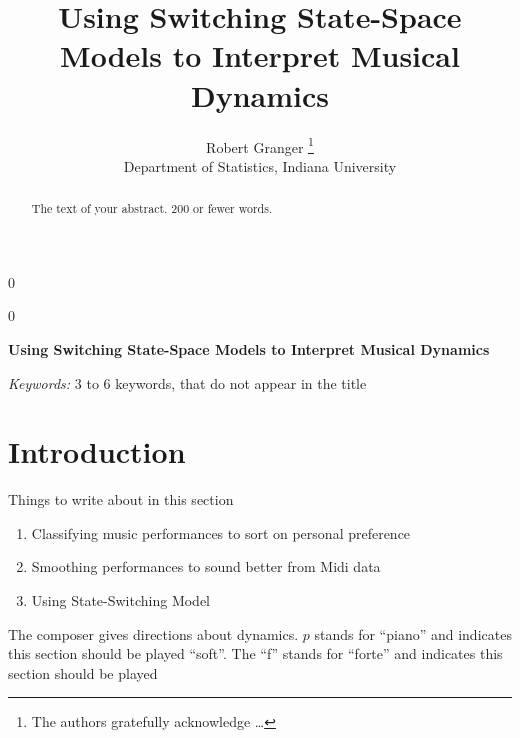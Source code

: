 \documentclass[12pt]{article}
\newcommand{\blind}{0}
\begin{document}
\def\spacingset#1{\renewcommand{\baselinestretch}%
{#1}\small\normalsize} \spacingset{1}



\blind
{
  \title{\bf Using Switching State-Space Models to Interpret Musical Dynamics}

  \author{
        Robert Granger \thanks{The authors gratefully acknowledge \ldots{}} \\
    Department of Statistics, Indiana University\\
      }
  \maketitle
} \fi

\blind
{
  \bigskip
  \bigskip
  \bigskip
  \begin{center}
    {\LARGE\bf Using Switching State-Space Models to Interpret Musical Dynamics}
  \end{center}
  \medskip
} \fi

\bigskip
\begin{abstract}
The text of your abstract. 200 or fewer words.
\end{abstract}

\noindent%
{\it Keywords:} 3 to 6 keywords, that do not appear in the title
\vfill

\newpage
\spacingset{1.45} %

\hypertarget{introduction}{%
\section{Introduction}\label{introduction}}

\def\algorithmautorefname{Algorithm}

Things to write about in this section

\begin{enumerate}
\def\labelenumi{\arabic{enumi})}
\item
  Classifying music performances to sort on personal preference
\item
  Smoothing performances to sound better from Midi data
\item
  Using State-Switching Model
\end{enumerate}

The composer gives directions about dynamics. \(p\) stands for ``piano''
and indicates this section should be played ``soft''. The ``f'' stands
for ``forte'' and indicates this section should be played
\end{document}
